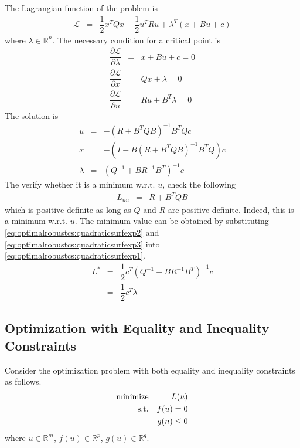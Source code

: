 The Lagrangian function of the problem is
\begin{eqnarray}
  \mathcal{L} &=& \dfrac{1}{2}x^TQx + \dfrac{1}{2}u^TRu + \lambda^T(x + Bu + c) \nonumber
\end{eqnarray}
where $\lambda \in\mathbb{R}^n$. The necessary condition for a critical point is
\begin{eqnarray}
  \dfrac{\partial \mathcal{L}}{\partial \lambda} &=& x + Bu + c = 0 \\
  \dfrac{\partial \mathcal{L}}{\partial x} &=& Qx + \lambda = 0 \\
  \dfrac{\partial \mathcal{L}}{\partial u} &=& Ru + B^T\lambda = 0 \nonumber
\end{eqnarray}
The solution is
\begin{eqnarray}
  u &=& -\left(R+B^TQB\right)^{-1}B^TQc \label{eq:optimalrobustcs:quadraticsurfexp2} \\
  x &=& -\left(I-B\left(R+B^TQB\right)^{-1}B^TQ\right)c \label{eq:optimalrobustcs:quadraticsurfexp3} \\
  \lambda &=& \left(Q^{-1}+BR^{-1}B^T\right)^{-1}c \nonumber
\end{eqnarray}
The verify whether it is a minimum w.r.t. $u$, check the following
\begin{eqnarray}
  L_{uu} &=& R+B^TQB \nonumber
\end{eqnarray}
which is positive definite as long as $Q$ and $R$ are positive definite. Indeed, this is a minimum w.r.t. $u$. The minimum value can be obtained by substituting \eqref{eq:optimalrobustcs:quadraticsurfexp2} and \eqref{eq:optimalrobustcs:quadraticsurfexp3} into \eqref{eq:optimalrobustcs:quadraticsurfexp1}.
\begin{eqnarray}
  L^* &=& \dfrac{1}{2}c^T\left(Q^{-1}+BR^{-1}B^T\right)^{-1}c \nonumber \\
  &=& \dfrac{1}{2}c^T\lambda \nonumber
\end{eqnarray}

\subsection{Optimization with Equality and Inequality Constraints} \label{sec:optimization-lagraigian-eq-ineq}

Consider the optimization problem with both equality and inequality constraints as follows.
\begin{eqnarray}
	\textup{minimize} && L(u) \nonumber \\
	\textup{s.t.} && f(u) = 0 \nonumber \\
    && g(n) \leq 0 \label{eq:optimalrobustcs:inequalityconstraint2}
\end{eqnarray}
where $u\in\mathbb{R}^m$, $f(u)\in\mathbb{R}^p$, $g(u)\in\mathbb{R}^q$.

